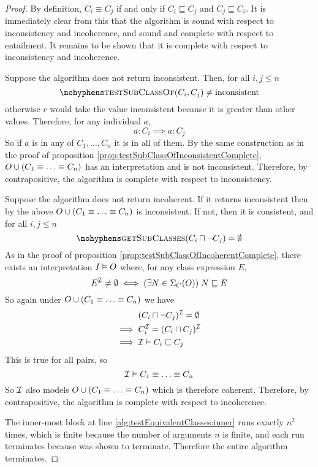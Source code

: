 \documentclass[paper.tex]{subfiles}
\begin{document}
\begin{proof}
  By definition, $C_i \equiv C_j$ if and only if $C_i \sqsubseteq C_j$ and $C_j \sqsubseteq C_i$.  It is immediately clear from this that the algorithm is sound with respect to inconsistency and incoherence, and sound and complete with respect to entailment.  It remains to be shown that it is complete with respect to inconsistency and incoherence.

  Suppose the algorithm does not return inconsistent.  Then, for all $i,j \le n$
  \[ \textproc{testSubClassOf}(C_i, C_j) \ne \mathrm{inconsistent} \]
  otherwise $r$ would take the value inconsistent because it is greater than other values.
  Therefore, for any individual $a$,
  \[ a : C_i \implies a : C_j \]
  So if $a$ is in any of $C_1, \ldots, C_n$ it is in all of them.  By the same construction as in the proof of proposition \ref{prop:testSubClassOfInconsistentComplete}, $O \cup (C_1 \equiv \ldots \equiv C_n)$ has an interpretation and is not inconsistent.  Therefore, by contrapositive, the algorithm is complete with respect to inconsistency.

  Suppose the algorithm does not return incoherent.  If it returns inconsistent then by the above $O \cup (C_1 \equiv \ldots \equiv C_n)$ is inconsistent.  If not, then it is consistent, and for all $i,j \le n$
  \[ \textproc{getSubClasses}(C_i \sqcap \neg C_j) = \emptyset \]
  As in the proof of proposition \ref{prop:testSubClassOfIncoherentComplete}, there exists an interpretation $I \vDash O$ where, for any class expression $E$,
  \[ E^{\mathcal{I}} \ne \emptyset \iff (\exists N \in \Sigma_C(O)) \; N \sqsubseteq E \]
  So again under $O \cup (C_1 \equiv \ldots \equiv C_n)$ we have
  \begin{align*}
    & (C_i \sqcap \neg C_j)^{\mathcal{I}} = \emptyset \\
    \implies{}& C_i^{\mathcal{I}} = (C_i \sqcap C_j)^{\mathcal{I}} \\
    \implies{}& \mathcal{I} \vDash C_i \sqsubseteq C_j
  \end{align*}
  This is true for all pairs, so
  \[ \mathcal{I} \vDash C_1 \equiv \ldots \equiv C_n \]
  So $\mathcal{I}$ also models $O \cup (C_1 \equiv \ldots \equiv C_n)$ which is therefore coherent.  Therefore, by contrapositive, the algorithm is complete with respect to incoherence.

  The inner-most block at line \ref{alg:testEquivalentClasses:inner} runs exactly $n^2$ times, which is finite because the number of arguments $n$ is finite, and each run terminates because  was shown to terminate.  Therefore the entire algorithm terminates.
\end{proof}
\end{document}
